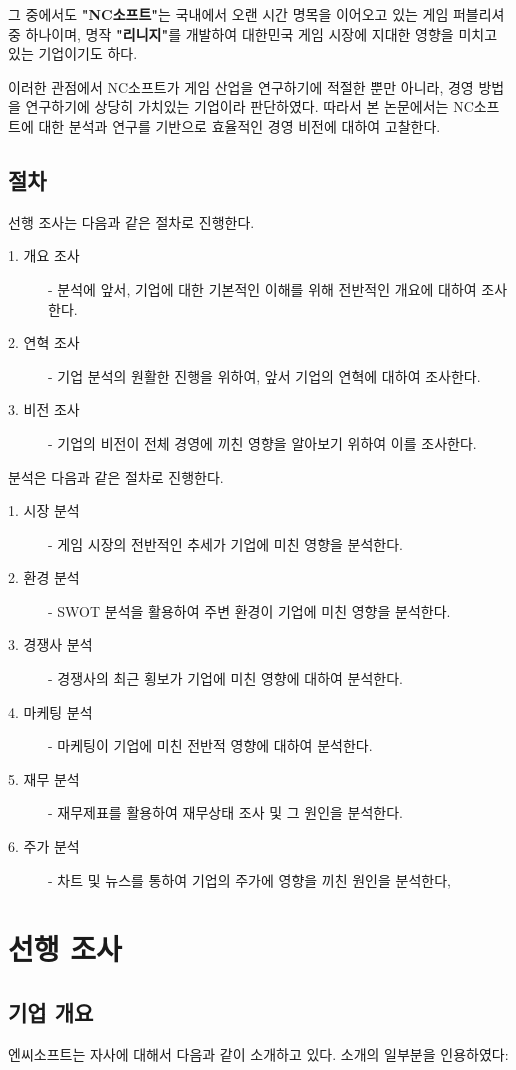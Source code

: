 \documentclass[11pt]{oblivoir}
\begin{document}
			그 중에서도 \textbf{"NC소프트"}는 국내에서 오랜 시간 명목을 이어오고 있는 게임 퍼블리셔 중 하나이며, 명작 \textbf{"리니지"}를 개발하여 대한민국 게임 시장에 지대한 영향을 미치고 있는 기업이기도 하다. 
			
			이러한 관점에서 NC소프트가 게임 산업을 연구하기에 적절한 뿐만 아니라, 경영 방법을 연구하기에 상당히 가치있는 기업이라 판단하였다. 따라서 본 논문에서는 NC소프트에 대한 분석과 연구를 기반으로 효율적인 경영 비전에 대하여 고찰한다.
			
		\subsection{절차}
			\noindent 선행 조사는 다음과 같은 절차로 진행한다.
			\begin{description}
				\item[1. 개요 조사] - 분석에 앞서, 기업에 대한 기본적인 이해를 위해 전반적인 개요에 대하여 조사한다.
				\item[2. 연혁 조사] - 기업 분석의 원활한 진행을 위하여, 앞서 기업의 연혁에 대하여 조사한다.
				\item[3. 비전 조사] - 기업의 비전이 전체 경영에 끼친 영향을 알아보기 위하여 이를 조사한다.
			\end{description}
			분석은 다음과 같은 절차로 진행한다.
			\begin{description}
				\item[1. 시장 분석] - 게임 시장의 전반적인 추세가 기업에 미친 영향을 분석한다.
				\item[2. 환경 분석] - SWOT 분석을 활용하여 주변 환경이 기업에 미친 영향을 분석한다. 
				\item[3. 경쟁사 분석] - 경쟁사의 최근 횡보가 기업에 미친 영향에 대하여 분석한다.
				\item[4. 마케팅 분석] - 마케팅이 기업에 미친 전반적 영향에 대하여 분석한다.
				\item[5. 재무 분석] - 재무제표를 활용하여 재무상태 조사 및 그 원인을 분석한다.
				\item[6. 주가 분석] - 차트 및 뉴스를 통하여 기업의 주가에 영향을 끼친 원인을 분석한다,
			\end{description}
	
	\section{선행 조사}
		\subsection{기업 개요}
		\noindent 엔씨소프트는 자사에 대해서 다음과 같이 소개하고 있다. 소개의 일부분을 인용하였다:
		
\end{document}
